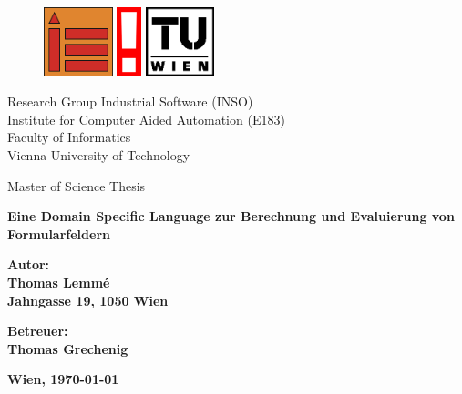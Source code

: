 \pagestyle{empty}

    	\begin{figure}[hp]
				\centering
				\includegraphics[height=20mm, clip]{figures/inso-farbe}
		 	    \hspace{1mm}
		 	    \includegraphics[height=20mm, clip]{figures/info-farbe}
		 	    \hspace{1mm}
					\includegraphics[height=20mm, clip]{figures/tu-dt-teil-schw-pos}
				\label{fig:TU-Wien}
			\end{figure} 
			
\begin{center}
    \Large
    Research Group Industrial Software (INSO)\\
    Institute for Computer Aided Automation (E183)\\
    Faculty of Informatics\\
    Vienna University of Technology\\

\end{center}

\bigskip

\begin{center}
    \Large
    \centering Master of Science Thesis
    \end{center}
    
\bigskip

\begin{center}
    \Huge\bfseries
    Eine Domain Specific Language zur Berechnung und Evaluierung von Formularfeldern
\end{center}

\bigskip
\bigskip

\begin{center}
    \Large\bfseries
    \noindent
    \centering Autor: \\Thomas Lemm\'{e} \\
    Jahngasse 19, 1050 Wien
\end{center}
\bigskip
\begin{center}
    \Large\bfseries
    \noindent
    \centering Betreuer: \\Thomas Grechenig \\
\end{center}
\bigskip
\begin{center}
    \Large\bfseries
    \noindent
    \centering Wien, \today
\end{center}

\vspace*{\fill}

\cleardoublepage

\rmfamily
\normalfont

